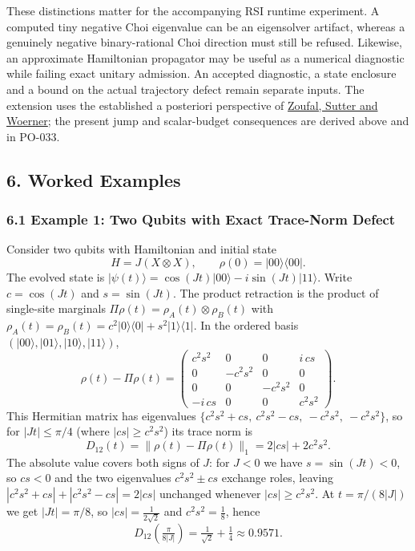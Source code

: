 \documentclass[
  11pt,
]{article}
\begin{document}
These distinctions matter for the accompanying RSI runtime experiment. A computed tiny negative Choi eigenvalue can be an eigensolver artifact, whereas a genuinely negative binary-rational Choi direction must still be refused. Likewise, an approximate Hamiltonian propagator may be useful as a numerical diagnostic while failing exact unitary admission. An accepted diagnostic, a state enclosure and a bound on the actual trajectory defect remain separate inputs. The extension uses the established a posteriori perspective of \href{https://arxiv.org/abs/2108.00022v2}{Zoufal, Sutter and Woerner}; the present jump and scalar-budget consequences are derived above and in PO-033.

\subsection{6. Worked Examples}\label{worked-examples}

\subsubsection{6.1 Example 1: Two Qubits with Exact Trace-Norm Defect}\label{example-1-two-qubits-with-exact-trace-norm-defect}

Consider two qubits with Hamiltonian and initial state
\[H = J(X \otimes X), \qquad \rho(0) = |00\rangle\langle 00|.\]
The evolved state is \(|\psi(t)\rangle = \cos(Jt)|00\rangle - i\sin(Jt)|11\rangle\). Write \(c=\cos(Jt)\) and \(s=\sin(Jt)\). The product retraction is the product of single-site marginals \(\Pi\rho(t)=\rho_A(t)\otimes\rho_B(t)\) with \(\rho_A(t)=\rho_B(t)=c^2|0\rangle\langle0|+s^2|1\rangle\langle1|\). In the ordered basis \((|00\rangle,|01\rangle,|10\rangle,|11\rangle)\),
\[\rho(t)-\Pi\rho(t)=\begin{pmatrix} c^2s^2 & 0 & 0 & i\,cs\\ 0 & -c^2s^2 & 0 & 0\\ 0 & 0 & -c^2s^2 & 0\\ -i\,cs & 0 & 0 & c^2s^2 \end{pmatrix}.\]
This Hermitian matrix has eigenvalues \(\{c^2s^2+cs,\ c^2s^2-cs,\ -c^2s^2,\ -c^2s^2\}\), so for \(|Jt|\le\pi/4\) (where \(|cs|\ge c^2s^2\)) its trace norm is
\[D_{12}(t)=\lVert\rho(t)-\Pi\rho(t)\rVert_1 = 2|cs|+2c^2s^2.\]
The absolute value covers both signs of \(J\): for \(J<0\) we have \(s=\sin(Jt)<0\), so \(cs<0\) and the two eigenvalues \(c^2s^2\pm cs\) exchange roles, leaving \(|c^2s^2+cs|+|c^2s^2-cs|=2|cs|\) unchanged whenever \(|cs|\ge c^2s^2\). At \(t=\pi/(8|J|)\) we get \(|Jt|=\pi/8\), so \(|cs|=\tfrac{1}{2\sqrt2}\) and \(c^2s^2=\tfrac18\), hence
\[D_{12}\!\left(\tfrac{\pi}{8|J|}\right)=\tfrac{1}{\sqrt2}+\tfrac14\approx 0.9571.\]
\end{document}
